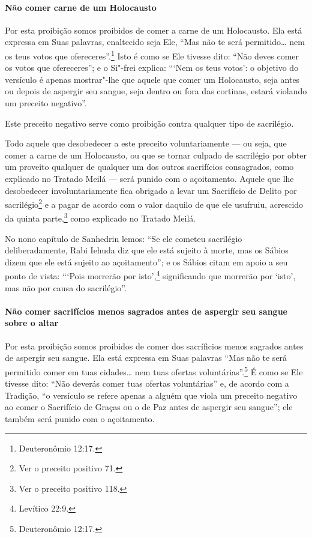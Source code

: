 \begin{multicols}{2}
\paragraph{Não comer carne de um Holocausto}

Por esta proibição somos proibidos de comer a carne de um Holocausto.
Ela está expressa em Suas palavras, enaltecido seja Ele, ``Mas não te
será permitido\ldots{} nem os teus votos que ofereceres''.\footnote{Deuteronômio
12:17.} Isto é como se Ele tivesse dito: ``Não deves comer os votos que
ofereceres''; e o Si"-frei explica: ```Nem os teus votos': o objetivo do
versículo é apenas mostrar"-lhe que aquele que comer um Holocausto, seja
antes ou depois de aspergir seu sangue, seja dentro ou fora das
cortinas, estará violando um preceito negativo''.

Este preceito negativo serve como proibição contra qualquer tipo de
sacrilégio.

Todo aquele que desobedecer a este preceito voluntariamente --- ou seja,
que comer a carne de um Holocausto, ou que se tornar culpado de
sacrilégio por obter um proveito qualquer de qualquer um dos outros
sacrifícios consagrados, como explicado no Tratado Meilá\starr{} --- será
punido com o açoitamento. Aquele que lhe desobedecer involuntariamente
fica obrigado a levar um Sacrifício de Delito por
sacrilégio\footnote{Ver o preceito positivo 71.} e a pagar de acordo com o valor daquilo
de que ele usufruiu, acrescido da quinta parte,\footnote{Ver o preceito positivo 118.}
como explicado no Tratado Meilá\starr.

No nono capítulo de Sanhedrin\starr{} lemos: ``Se ele cometeu sacrilégio
deliberadamente, Rabi Iehuda\starr{} diz que ele está sujeito à morte, mas os
Sábios dizem que ele está sujeito ao açoitamento''; e os Sábios citam em
apoio a seu ponto de vista: ```Pois morrerão por isto',\footnote{Levítico 22:9.}
significando que morrerão por `isto', mas não por causa do
sacrilégio''.

\paragraph{Não comer sacrifícios menos sagrados antes de aspergir seu sangue sobre o altar}

Por esta proibição somos proibidos de comer dos sacríficios menos
sagrados antes de aspergir seu sangue. Ela está expressa em Suas
palavras ``Mas não te será permitido comer em tuas cidades\ldots{} nem tuas
ofertas voluntárias''.\footnote{Deuteronômio 12:17.} É como se Ele tivesse dito:
``Não deverás comer tuas ofertas voluntárias'' e, de acordo com a
Tradição, ``o versículo se refere apenas
a alguém que viola um preceito negativo ao comer o Sacrifício de Graças
ou o de Paz antes de aspergir seu sangue''; ele também será punido com o
açoitamento.


\end{multicols}

